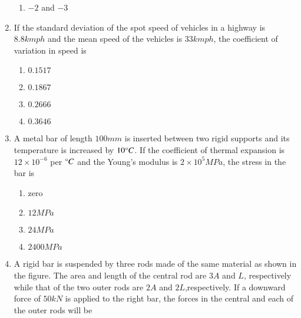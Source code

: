 \documentclass[journal,12pt,onecolumn]{IEEEtran}
\theoremstyle{remark}
\begin{document}
\begin{enumerate}[start=18]
\begin{enumerate}
                \item $-2$ and $-3$
        \end{enumerate}
\item If the standard deviation of the spot speed of vehicles in a highway is $8.8 kmph$ and the mean speed of the vehicles is $33 kmph$, the coefficient of variation in speed is 
	\begin{enumerate}
                \item $0.1517$
                \item $0.1867$
                \item $0.2666$
                \item $0.3646$
        \end{enumerate}
\item A metal bar of length $100 mm$ is inserted between two rigid supports and its temperature is increased by $10{\degree}C$. If the coefficient of thermal expansion is $12 \times 10^{-6}$ per ${\degree}C$ and the Young's modulus is $2 \times 10^5 MPa$, the stress in the bar is 
	\begin{enumerate}
                \item zero
                \item $12 MPa$
                \item $24 MPa$
                \item $2400 MPa$
        \end{enumerate}
\item A rigid bar is suspended by three rods made of the same material as shown in the figure. The area and length of the central rod are $3A$ and $L$, respectively while that of the two outer rods are $2A$ and $2L$,respectively. If a downward force of $50 kN$ is applied to the right bar, the forces in the central and each of the outer rods will be\\
	\begin{center}	 \end{center}
		\begin{enumerate}

\end{enumerate}
\end{enumerate}
\end{document}
